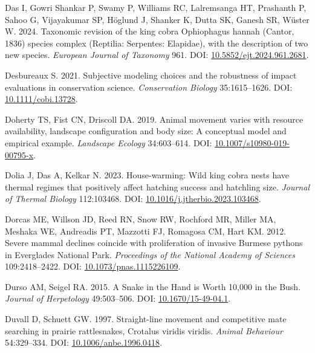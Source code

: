 \documentclass[10pt,a4paper]{article}
\newlength{\cslhangindent}
\newenvironment{CSLReferences}[2] %
 {\begin{list}{}{%
  \setlength{\itemindent}{0pt}
  \setlength{\leftmargin}{0pt}
  \setlength{\parsep}{0pt}
  \ifodd #1
   \setlength{\leftmargin}{\cslhangindent}
   \setlength{\itemindent}{-1\cslhangindent}
  \fi
  \setlength{\itemsep}{#2\baselineskip}}}
 {\end{list}}
\begin{document}
\begin{CSLReferences}{1}{0}
Das I, Gowri Shankar P, Swamy P, Williams RC, Lalremsanga HT, Prashanth P, Sahoo G, Vijayakumar SP, Höglund J, Shanker K, Dutta SK, Ganesh SR, Wüster W. 2024. Taxonomic revision of the king cobra {Ophiophagus} hannah ({Cantor}, 1836) species complex ({Reptilia}: {Serpentes}: {Elapidae}), with the description of two new species. \emph{European Journal of Taxonomy} 961. DOI: \href{https://doi.org/10.5852/ejt.2024.961.2681}{10.5852/ejt.2024.961.2681}.

Desbureaux S. 2021. Subjective modeling choices and the robustness of impact evaluations in conservation science. \emph{Conservation Biology} 35:1615--1626. DOI: \href{https://doi.org/10.1111/cobi.13728}{10.1111/cobi.13728}.

Doherty TS, Fist CN, Driscoll DA. 2019. Animal movement varies with resource availability, landscape configuration and body size: A conceptual model and empirical example. \emph{Landscape Ecology} 34:603--614. DOI: \href{https://doi.org/10.1007/s10980-019-00795-x}{10.1007/s10980-019-00795-x}.

Dolia J, Das A, Kelkar N. 2023. House-warming: {Wild} king cobra nests have thermal regimes that positively affect hatching success and hatchling size. \emph{Journal of Thermal Biology} 112:103468. DOI: \href{https://doi.org/10.1016/j.jtherbio.2023.103468}{10.1016/j.jtherbio.2023.103468}.

Dorcas ME, Willson JD, Reed RN, Snow RW, Rochford MR, Miller MA, Meshaka WE, Andreadis PT, Mazzotti FJ, Romagosa CM, Hart KM. 2012. Severe mammal declines coincide with proliferation of invasive {Burmese} pythons in {Everglades} {National} {Park}. \emph{Proceedings of the National Academy of Sciences} 109:2418--2422. DOI: \href{https://doi.org/10.1073/pnas.1115226109}{10.1073/pnas.1115226109}.

Durso AM, Seigel RA. 2015. A {Snake} in the {Hand} is {Worth} 10,000 in the {Bush}. \emph{Journal of Herpetology} 49:503--506. DOI: \href{https://doi.org/10.1670/15-49-04.1}{10.1670/15-49-04.1}.

Duvall D, Schuett GW. 1997. Straight-line movement and competitive mate searching in prairie rattlesnakes, {Crotalus} viridis viridis. \emph{Animal Behaviour} 54:329--334. DOI: \href{https://doi.org/10.1006/anbe.1996.0418}{10.1006/anbe.1996.0418}.


\end{CSLReferences}
\end{document}
